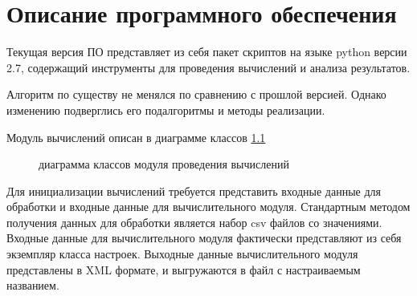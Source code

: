 \documentclass[utf8,usehyperref,12pt]{G7-32}
\begin{document}
%

\chapter{Описание программного обеспечения}
Текущая версия ПО представляет из себя пакет скриптов на языке python версии 2.7, содержащий инструменты для проведения вычислений и анализа результатов.

Алгоритм по существу не менялся по сравнению с прошлой версией. Однако изменению подверглись его подалгоритмы и методы реализации.

Модуль вычислений описан в диаграмме классов \ref{class-diagram}
\begin{figure}[H]
 \caption{диаграмма классов модуля проведения вычислений}\label{class-diagram}
\end{figure}
Для инициализации вычислений требуется представить входные данные для обработки и входные данные для вычислительного модуля. Стандартным методом получения данных для обработки является набор csv файлов со значениями. Входные данные для вычислительного модуля фактически представляют из себя экземпляр класса настроек. Выходные данные вычислительного модуля представлены в XML формате, и выгружаются в файл с настраиваемым названием.
\end{document}
